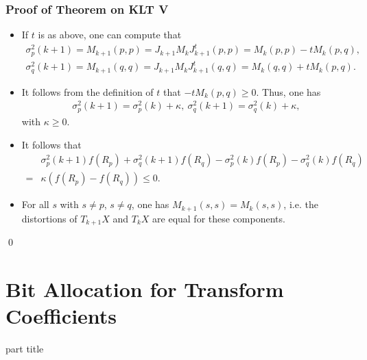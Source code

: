 \begin{frame}\frametitle{Proof of Theorem on KLT V}
\begin{itemize}
\item 
If $t$ is as above, one can compute that 
\begin{align*}
\sigma_p^2(k+1)=M_{k+1}(p,p)=J_{k+1}M_kJ_{k+1}^t(p,p)=M_k(p,p)-tM_k(p,q),\\
\sigma_q^2(k+1)=M_{k+1}(q,q)=J_{k+1}M_kJ_{k+1}^t(q,q)=M_k(q,q)+tM_k(p,q).
\end{align*}
\item It follows from the definition of $t$ that $-tM_k(p,q)\geq 0$. Thus, one has
\begin{align*}
\sigma_p^2(k+1)=\sigma_p^2(k)+\kappa,\:
\sigma_q^2(k+1)=\sigma_q^2(k)+\kappa,
\end{align*}
with $\kappa\geq 0$.
\item It follows that
\begin{align*}
&\sigma_p^2(k+1)f(R_p)+\sigma_q^2(k+1)f(R_q)-\sigma_p^2(k)f(R_p)-\sigma_q^2(k)f(R_q)\\
=&\kappa(f(R_p)-f(R_q))\leq 0.
\end{align*}
\item For all $s$ with $s\neq p$, $s\neq q$, one has $M_{k+1}(s,s)=M_{k}(s,s)$, i.e. the distortions of $T_{k+1}X$ and $T_kX$ are equal for these components. 
\end{itemize}
\qed
\end{frame}


\section{Bit Allocation for Transform Coefficients}
\begin{frame}
 \vspace{12.0ex}
\begin{center}
\begin{beamercolorbox}[sep=12pt,center]{part title}
\insertsection\par
\end{beamercolorbox}
\end{center}
\end{frame}




